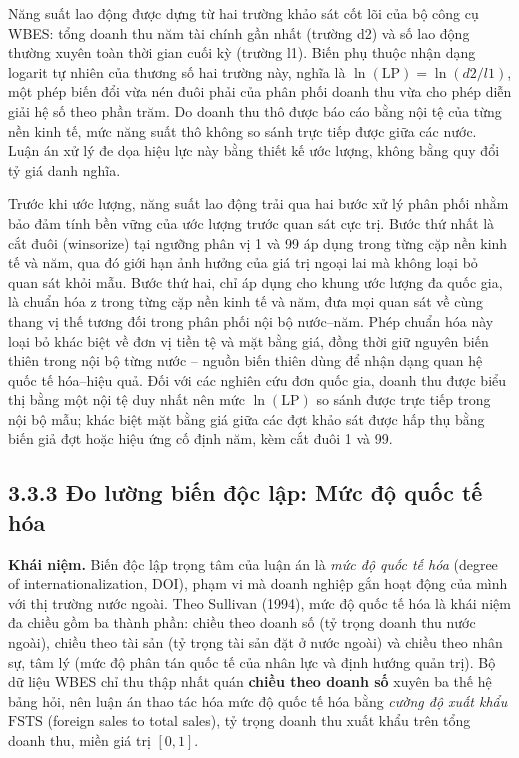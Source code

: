 \documentclass[
  a4paper,
  13pt]{extreport}
\begin{document}
Năng suất lao động được dựng từ hai trường khảo sát cốt lõi của bộ công
cụ WBES: tổng doanh thu năm tài chính gần nhất (trường d2) và số lao
động thường xuyên toàn thời gian cuối kỳ (trường l1). Biến phụ thuộc
nhận dạng logarit tự nhiên của thương số hai trường này, nghĩa là
\(\ln(\mathrm{LP}) = \ln(d2 / l1)\), một phép biến đổi vừa nén đuôi phải
của phân phối doanh thu vừa cho phép diễn giải hệ số theo phần trăm. Do
doanh thu thô được báo cáo bằng nội tệ của từng nền kinh tế, mức năng
suất thô không so sánh trực tiếp được giữa các nước. Luận án xử lý đe
dọa hiệu lực này bằng thiết kế ước lượng, không bằng quy đổi tỷ giá danh
nghĩa.

Trước khi ước lượng, năng suất lao động trải qua hai bước xử lý phân
phối nhằm bảo đảm tính bền vững của ước lượng trước quan sát cực trị.
Bước thứ nhất là cắt đuôi (winsorize) tại ngưỡng phân vị 1 và 99 áp dụng
trong từng cặp nền kinh tế và năm, qua đó giới hạn ảnh hưởng của giá trị
ngoại lai mà không loại bỏ quan sát khỏi mẫu. Bước thứ hai, chỉ áp dụng
cho khung ước lượng đa quốc gia, là chuẩn hóa z trong từng cặp nền kinh
tế và năm, đưa mọi quan sát về cùng thang vị thế tương đối trong phân
phối nội bộ nước--năm. Phép chuẩn hóa này loại bỏ khác biệt về đơn vị
tiền tệ và mặt bằng giá, đồng thời giữ nguyên biến thiên trong nội bộ
từng nước -- nguồn biến thiên dùng để nhận dạng quan hệ quốc tế
hóa--hiệu quả. Đối với các nghiên cứu đơn quốc gia, doanh thu được biểu
thị bằng một nội tệ duy nhất nên mức \(\ln(\mathrm{LP})\) so sánh được
trực tiếp trong nội bộ mẫu; khác biệt mặt bằng giá giữa các đợt khảo sát
được hấp thụ bằng biến giả đợt hoặc hiệu ứng cố định năm, kèm cắt đuôi 1
và 99.

\hypertarget{ux111o-lux1b0ux1eddng-biux1ebfn-ux111ux1ed9c-lux1eadp-mux1ee9c-ux111ux1ed9-quux1ed1c-tux1ebf-huxf3a}{%
\subsection{3.3.3 Đo lường biến độc lập: Mức độ quốc tế
hóa}\label{ux111o-lux1b0ux1eddng-biux1ebfn-ux111ux1ed9c-lux1eadp-mux1ee9c-ux111ux1ed9-quux1ed1c-tux1ebf-huxf3a}}

\textbf{Khái niệm.} Biến độc lập trọng tâm của luận án là \emph{mức độ
quốc tế hóa} (degree of internationalization, DOI), phạm vi mà doanh
nghiệp gắn hoạt động của mình với thị trường nước ngoài. Theo Sullivan
(1994), mức độ quốc tế hóa là khái niệm đa chiều gồm ba thành phần:
chiều theo doanh số (tỷ trọng doanh thu nước ngoài), chiều theo tài sản
(tỷ trọng tài sản đặt ở nước ngoài) và chiều theo nhân sự, tâm lý (mức
độ phân tán quốc tế của nhân lực và định hướng quản trị). Bộ dữ liệu
WBES chỉ thu thập nhất quán \textbf{chiều theo doanh số} xuyên ba thế hệ
bảng hỏi, nên luận án thao tác hóa mức độ quốc tế hóa bằng \emph{cường
độ xuất khẩu} \(\mathrm{FSTS}\) (foreign sales to total sales), tỷ trọng
doanh thu xuất khẩu trên tổng doanh thu, miền giá trị \([0,1]\).
\end{document}
